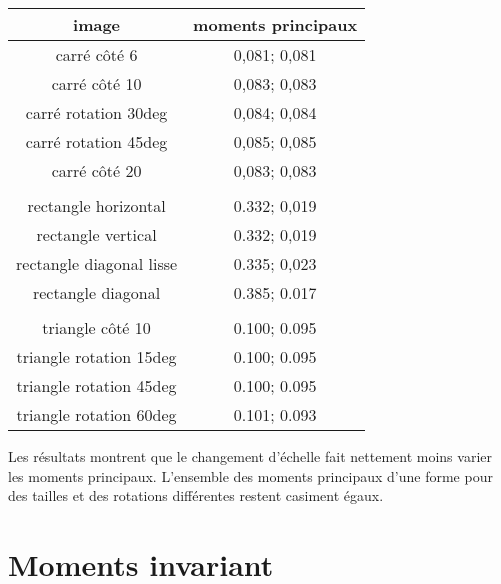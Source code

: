 \documentclass{article}
\begin{document}
   \begin{center}
    \begin{tabular}{|c|c|}
      \hline
      \textbf{image} & \textbf{moments principaux} \\
      \hline
      carré côté 6 & 0,081; 0,081 \\
      \hline
      carré côté 10 & 0,083; 0,083 \\
      \hline
      carré rotation 30deg & 0,084; 0,084 \\
      \hline
      carré rotation 45deg & 0,085; 0,085 \\
      \hline
      carré côté 20 & 0,083; 0,083 \\
      \hline
       & \\
      \hline
      rectangle horizontal & 0.332; 0,019 \\
      \hline
      rectangle vertical & 0.332; 0,019 \\
      \hline
      rectangle diagonal lisse & 0.335; 0,023 \\
      \hline
      rectangle diagonal & 0.385; 0.017 \\
      \hline
       & \\
      \hline
      triangle côté 10 & 0.100; 0.095\\
      \hline
      triangle rotation 15deg & 0.100; 0.095\\
      \hline
      triangle rotation 45deg & 0.100; 0.095\\
      \hline
      triangle rotation 60deg & 0.101; 0.093\\
      \hline
    \end{tabular}
  \end{center}
  
  Les résultats montrent que le changement d'échelle fait nettement moins varier les moments
  principaux. L'ensemble des moments principaux d'une forme pour des tailles et des rotations
  différentes restent casiment égaux.\\
  
  \section{Moments invariant}
  
    
\end{document}
